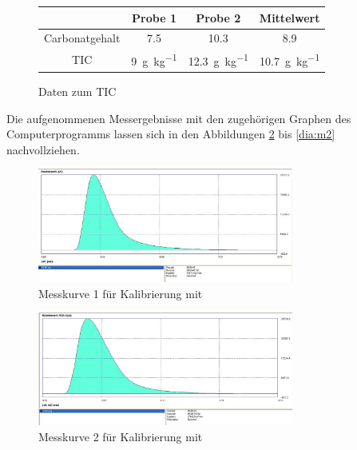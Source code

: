 \vspace*{-7mm}
\begin{figure}[h!]
	\renewcommand{\arraystretch}{1.2}
	\centering
	\caption{Daten zum TIC}
	\label{tab:tic}
	\begin{tabular}{c|c|c|c}
		\hline
		 					& \textbf{Probe 1} 			& \textbf{Probe 2}   		& \textbf{Mittelwert}\\
		\hline
		Carbonatgehalt		&	 \SI{7,5}{\mpercent}		&  \SI{10,3}{\mpercent}		& \SI{8,9}{\mpercent}\\
		TIC					&	\SI{9}{\gram \per \kg}	& \SI{12,3}{\gram \per \kg}	& \SI{10,7}{\gram \per \kg}  \\
		\hline
	\end{tabular}
\end{figure}
\FloatBarrier


\newpage

Die aufgenommenen Messergebnisse mit den zugehörigen Graphen des Computerprogramms lassen sich in den Abbildungen \ref{dia:k1} bis \ref{dia:m2} nachvollziehen.
\begin{figure}[h!]
	\centering
	\includegraphics[width=0.75\textwidth]{img/CaCO3_k1}
	\caption{Messkurve 1 für Kalibrierung mit }
	\label{dia:k1}
\end{figure}
\FloatBarrier

\begin{figure}[h!]
	\centering
	\includegraphics[width=0.75\textwidth]{img/CaCO3_k2}
	\caption{Messkurve 2 für Kalibrierung mit }
	\label{dia:k2}
\end{figure}
\FloatBarrier

